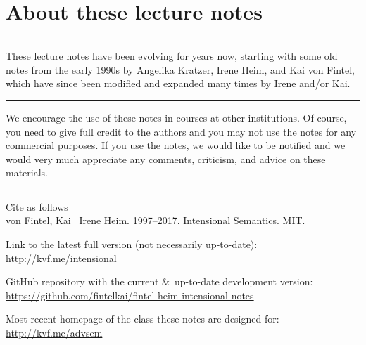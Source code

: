 \frontmatter

\title{}
\author{\and{}}
\date{\\[18pt] [last changed on \today]}

\pagestyle{empty}

\maketitle

\cleardoublepage

\section*{About these lecture notes}

\plainbreak{1} 

These lecture notes have been evolving for years now, starting with some old
notes from the early 1990s by Angelika Kratzer, Irene Heim, and Kai von Fintel,
which have since been modified and expanded many times by Irene and/or Kai.

\plainbreak{1} 

We encourage the use of these notes in courses at other institutions. Of course,
you need to give full credit to the authors and you may not use the notes for
any commercial purposes. If you use the notes, we would like to be notified and
we would very much appreciate any comments, criticism, and advice on these
materials.

\plainbreak{1}

Cite as follows\\[6pt]\null\hfill
von Fintel, Kai \amp\ Irene Heim. 1997--2017. Intensional Semantics. MIT.

\medskip

\noindent Link to the latest full version (not necessarily up-to-date):\\[6pt]
                                             \null\hfill\url{http://kvf.me/intensional}
\medskip
                                            
\noindent GitHub repository with the current \&\ up-to-date development version:\\[6pt]
            \null\hfill\url{https://github.com/fintelkai/fintel-heim-intensional-notes}

\medskip

\noindent Most recent homepage of the class these notes are designed for:\\[6pt]
\null\hfill\url{http://kvf.me/advsem}


